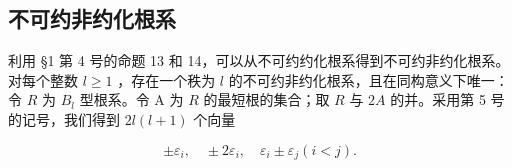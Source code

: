 \subsection{不可约非约化根系}

利用 §1 第 4 号的命题 13 和 14，可以从不可约约化根系得到不可约非约化根系。对每个整数 \(l \geqslant 1\) ，存在一个秩为 \(l\) 的不可约非约化根系，且在同构意义下唯一：令 \(R\) 为 \(B_l\) 型根系。令 A 为 \(R\) 的最短根的集合；取 \(R\) 与 \(2A\) 的并。采用第 5 号的记号，我们得到 \(2l(l + 1)\) 个向量

\[
\pm \varepsilon_ {i}, \quad \pm 2 \varepsilon_ {i}, \quad \varepsilon_ {i} \pm \varepsilon_ {j} (i <   j).
\]

